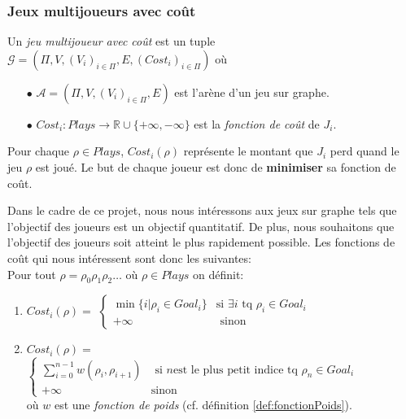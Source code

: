 \subsubsection{Jeux multijoueurs avec coût}

\begin{defi}
	Un \textit{jeu multijoueur avec coût} est un tuple $\mathcal{G} = (\Pi ,V ,(V_{i})_{i \in \Pi} ,E ,(Cost_{i})_{i \in \Pi})$ où
	\begin{enumerate}
		\item[$\bullet$] $\mathcal{A} = (\Pi ,V ,(V_{i})_{i \in \Pi} ,E )$ est l'arène d'un jeu sur graphe.
		\item[$\bullet$] $Cost_{i}: Plays \rightarrow \mathbb{R} \cup \{ +\infty , -\infty \} $ est la \textit{fonction de coût} de $J_{i}$. 
	\end{enumerate}
\end{defi}


	Pour chaque $\rho \in Plays$, $Cost_{i}(\rho)$ représente le montant que $J_{i}$ perd quand le jeu $\rho$ est joué.
	Le but de chaque joueur est donc de \textbf{minimiser} sa fonction de coût.

\begin{exemple}
	\label{ex:fonctionsCout}
  Dans le cadre de ce projet, nous nous intéressons aux jeux sur graphe tels que l'objectif des joueurs est un objectif quantitatif. De plus, nous souhaitons que l'objectif des joueurs soit atteint le plus rapidement possible. Les fonctions de coût qui nous intéressent sont donc les suivantes: \\
	
	Pour tout  $\rho = \rho _{0} \rho _{1} \rho _{2} \ldots $ où $\rho \in Plays$ on définit:
	\begin{enumerate}
	\item $Cost_{i}(\rho) = $ $\begin{cases} 
									\min \{ i | \rho _{i} \in Goal_{i} \} & \text{si } \exists i \text{ tq } \rho _{i} \in Goal_{i} \\
									+\infty & \text{ sinon}
									\end{cases}$
	\item $Cost_{i}(\rho) = $ $\begin{cases}
									\sum_{i = 0}^{n-1} w(\rho_{i},\rho_{i+1}) & \text{ si } n \text{est le plus petit indice tq } \rho_{n}\in 					  Goal_{i}\\
									+\infty & \text{sinon}
									\end{cases}$ \\
									où $w$ est une \textit{fonction de poids} (cf. définition \ref{def:fonctionPoids}).
	\end{enumerate}
\end{exemple}

